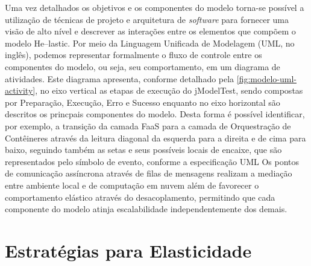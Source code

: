 \documentclass[english,brazilian]{UNISINOSmonografia} %
\begin{document}
Uma vez detalhados os objetivos e os componentes do modelo torna-se possível a utilização de técnicas de projeto e arquitetura de \textit{software} para fornecer uma visão de alto nível e descrever as interações entre os elementos que compõem o modelo \textsf{He}--lastic.
Por meio da Linguagem Unificada de Modelagem (UML, no inglês), podemos representar formalmente o fluxo de controle entre os componentes do modelo, ou seja, seu comportamento, em um diagrama de atividades.
%
Este diagrama apresenta, conforme detalhado pela \autoref{fig:modelo-uml-activity}, no eixo vertical as etapas de execução do jModelTest, sendo compostas por { Preparação,  Execução, Erro e Sucesso} enquanto no eixo horizontal são descritos os princpais componentes do modelo.
%
Desta forma é possível identificar, por exemplo, a transição da camada FaaS para a camada de Orquestração de Contêineres através da leitura diagonal da esquerda para a direita e de cima para baixo, seguindo também as setas e seus possíveis locais de encaixe, que são representados pelo símbolo de evento, conforme a especificação UML
%
Os pontos de comunicação assíncrona através de filas de mensagens realizam a mediação entre ambiente local e de computação em nuvem além de favorecer o comportamento elástico através do desacoplamento, permitindo que cada componente do modelo atinja escalabilidade independentemente dos demais.




\section{Estratégias para Elasticidade}
\label{sec:estrategias-elasticidade}
\end{document}
